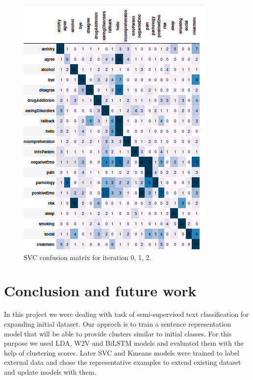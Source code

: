 \documentclass[11pt]{article}
\begin{document}
\begin{figure}[h]
	\includegraphics[scale=0.25]{svc2_cm.png}
	\caption{SVC confusion matrix for iteration 0, 1, 2.}
\label{rbf_svc_cm}
\end{figure}
\FloatBarrier


\section{Conclusion and future work}
\label{sec:conclusion}


In this project we were dealing with task of semi-supervised text classification for expanding initial dataset. Our approch is to train a sentence representation model that will be able to provide clusters similar to initial classes. For this purpose we used LDA, W2V and BiLSTM models and  evaluated them with the help of clustering scores. Later SVC and Kmeans models were trained to label external data and chose the representative examples to extend existing dataset and update models with them.

\end{document}
